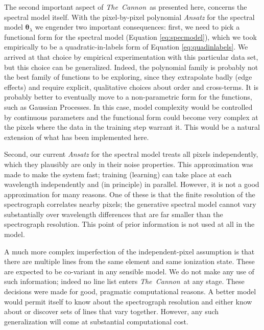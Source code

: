 \documentclass[12pt, preprint]{aastex}
\newcommand{\tc}{\textsl{The~Cannon}}
\newcommand{\set}[1]{\bm{#1}}
\begin{document}
The second important aspect of \tc\ as presented here, concerns the spectral model itself. With the pixel-by-pixel polynomial \textit{Ansatz} for the spectral model $\set{\theta}_\lambda$
we engender two important consequences: first, we need to pick a functional form for the spectral model
(Equation \ref{eq:specmodel}), which we took empirically to be a quadratic-in-labels form of Equation \ref{eq:quadinlabels}. We arrived at that choice by empirical experimentation with this particular data set, but this choice can be generalized.
Indeed, the polynomial family is probably not the best family of
functions to be exploring, since they extrapolate badly (edge effects)
and require explicit, qualitative choices about order and cross-terms.
It is probably better to eventually move to a non-parametric form for the functions,
such as Gaussian Processes.
In this case, model complexity would be controlled by continuous
parameters and the functional form could become very complex at the pixels where the data in the
training step warrant it.
This would be a natural extension of what has been implemented here.

Second, our current \textit{Ansatz} for the spectral model treats all
pixels independently, which they plausibly are only in their noise properties.
This approximation was made to make the system fast; training
(learning) can take place at each wavelength independently and (in
principle) in parallel.
However, it is not a good approximation for many reasons.
One of these is that the finite resolution of the spectrograph
correlates nearby pixels; the generative spectral model cannot vary
substantially over wavelength differences that are far smaller than
the spectrograph resolution.
This point of prior information is not used at all in the model.

A much more complex imperfection of the independent-pixel assumption is 
 that there are multiple lines from the same element and same ionization state.
These are expected to be co-variant in any sensible model.
We do not make any use of such information; indeed no line list enters
\tc\ at any stage.
These decisions were made for good, pragmatic computational reasons.
A better model would permit itself to know about the spectrograph
resolution and either know about or discover sets of lines that vary
together.
However, any such generalization will come at substantial computational cost.
\end{document}
